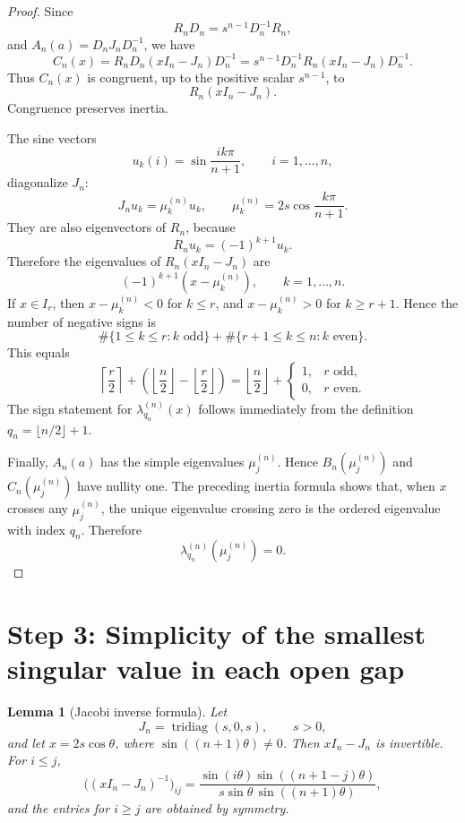\documentclass[11pt]{article}
\newtheorem{lemma}[theorem]{Lemma}
\begin{document}
\begin{proof}
Since
\[
R_nD_n=s^{n-1}D_n^{-1}R_n,
\]
and $A_n(a)=D_nJ_nD_n^{-1}$, we have
\[
C_n(x)
=R_nD_n(xI_n-J_n)D_n^{-1}
=s^{n-1}D_n^{-1}R_n(xI_n-J_n)D_n^{-1}.
\]
Thus $C_n(x)$ is congruent, up to the positive scalar $s^{n-1}$, to
\[
R_n(xI_n-J_n).
\]
Congruence preserves inertia.

The sine vectors
\[
u_k(i)=\sin\frac{ik\pi}{n+1},
\qquad i=1,\ldots,n,
\]
diagonalize $J_n$:
\[
J_nu_k=\mu_k^{(n)}u_k,
\qquad
\mu_k^{(n)}=2s\cos\frac{k\pi}{n+1}.
\]
They are also eigenvectors of $R_n$, because
\[
R_nu_k=(-1)^{k+1}u_k.
\]
Therefore the eigenvalues of $R_n(xI_n-J_n)$ are
\[
(-1)^{k+1}(x-\mu_k^{(n)}),
\qquad k=1,\ldots,n.
\]
If $x\in I_r$, then $x-\mu_k^{(n)}<0$ for $k\leq r$, and
$x-\mu_k^{(n)}>0$ for $k\geq r+1$.  Hence the number of negative signs is
\[
\#\{1\leq k\leq r:k\text{ odd}\}
+
\#\{r+1\leq k\leq n:k\text{ even}\}.
\]
This equals
\[
\left\lceil\frac r2\right\rceil
+
\left(\left\lfloor\frac n2\right\rfloor-
       \left\lfloor\frac r2\right\rfloor\right)
=
\left\lfloor\frac n2\right\rfloor
+
\begin{cases}
1,& r\text{ odd},\\
0,& r\text{ even}.
\end{cases}
\]
The sign statement for $\lambda_{q_n}^{(n)}(x)$ follows immediately from the
definition $q_n=\lfloor n/2\rfloor+1$.

Finally, $A_n(a)$ has the simple eigenvalues $\mu_j^{(n)}$.  Hence
$B_n(\mu_j^{(n)})$ and $C_n(\mu_j^{(n)})$ have nullity one.  The preceding
inertia formula shows that, when $x$ crosses any $\mu_j^{(n)}$, the unique
eigenvalue crossing zero is the ordered eigenvalue with index $q_n$.  Therefore
\[
\lambda_{q_n}^{(n)}(\mu_j^{(n)})=0.
\]
\end{proof}

\section*{Step 3: Simplicity of the smallest singular value in each open gap}

\begin{lemma}[Jacobi inverse formula]\label{lem:jacobi-inverse}
Let
\[
J_n=\operatorname{tridiag}(s,0,s),\qquad s>0,
\]
and let $x=2s\cos\theta$, where $\sin((n+1)\theta)\neq0$.  Then
$xI_n-J_n$ is invertible.  For $i\leq j$,
\[
\bigl((xI_n-J_n)^{-1}\bigr)_{ij}
=
\frac{
 \sin(i\theta)\sin((n+1-j)\theta)
}{
 s\sin\theta\,\sin((n+1)\theta)
},
\]
and the entries for $i\geq j$ are obtained by symmetry.
\end{lemma}
\end{document}
